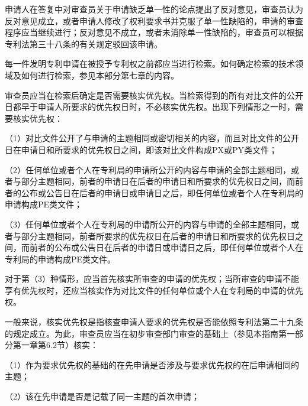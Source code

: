 申请人在答复中对审查员关于申请缺乏单一性的论点提出了反对意见，审查员认为反对意见成立，或者申请人修改了权利要求书并克服了单一性缺陷的，申请的审查程序应当继续进行；反对意见不成立，或者未消除单一性缺陷的，审查员可以根据专利法第三十八条的有关规定驳回该申请。

每一件发明专利申请在被授予专利权之前都应当进行检索。如何确定检索的技术领域及如何进行检索，参见本部分第七章的内容。

审查员应当在检索后确定是否需要核实优先权。当检索得到的所有对比文件的公开日都早于申请人所要求的优先权日时，不必核实优先权。出现下列情形之一时，需要核实优先权：

{\setlength{\parindent}{17.1bp}（1）对比文件公开了与申请的主题相同或密切相关的内容，而且对比文件的公开日在申请日和所要求的优先权日之间，即该对比文件构成PX或PY类文件；\par}

{\setlength{\parindent}{17.1bp}（2）任何单位或者个人在专利局的申请所公开的内容与申请的全部主题相同，或者与部分主题相同，前者的申请日在后者的申请日和所要求的优先权日之间，而前者的公布或公告日在后者的申请日或申请日之后，即任何单位或者个人在专利局的申请构成PE类文件；\par}

{\setlength{\parindent}{17.1bp}（3）任何单位或者个人在专利局的申请所公开的内容与申请的全部主题相同，或者与部分主题相同，前者所要求的优先权日在后者的申请日和所要求的优先权日之间，而前者的公布或公告日在后者的申请日或申请日之后，即任何单位或者个人在专利局的申请构成PE类文件。\par}

对于第（3）种情形，应当首先核实所审查的申请的优先权；当所审查的申请不能享有优先权时，还应当核实作为对比文件的任何单位或个人在专利局的申请的优先权。

一般来说，核实优先权是指核查申请人要求的优先权是否能依照专利法第二十九条的规定成立。为此，审查员应当在初步审查部门审查的基础上（参见本指南第一部分第一章第6.2节）核实：

{\setlength{\parindent}{17.1bp}（1）作为要求优先权的基础的在先申请是否涉及与要求优先权的在后申请相同的主题；\par}

{\setlength{\parindent}{17.1bp}（2）该在先申请是否是记载了同一主题的首次申请；\par}

